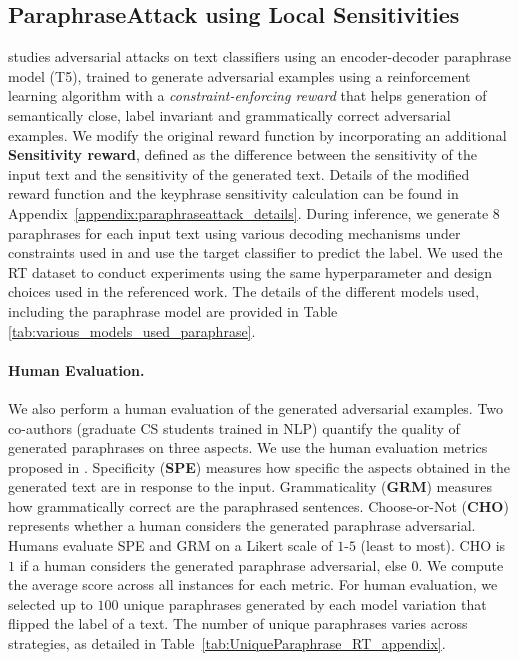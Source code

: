 \subsection{ParaphraseAttack using Local Sensitivities}
\label{sec:paraphraseAttack}
\citet{roth2024constraintenforcingrewardadversarialattacks} studies adversarial attacks on text classifiers using an encoder-decoder paraphrase model (T5), trained to generate adversarial examples using a reinforcement learning algorithm \cite{Williams2004SimpleSG} with a \textit{constraint-enforcing reward} that helps generation of semantically close, label invariant and grammatically correct adversarial examples. We modify the original reward function by incorporating an additional \textbf{Sensitivity reward}, defined as the difference between the sensitivity of the input text and the sensitivity of the generated text. Details of the modified reward function and the keyphrase sensitivity calculation can be found in Appendix~\ref{appendix:paraphraseattack_details}. During inference, we generate $8$ paraphrases for each input text using various decoding mechanisms under constraints used in \citet{roth2024constraintenforcingrewardadversarialattacks} and use the target classifier to predict the label. We used the RT dataset to conduct experiments using the same hyperparameter and design choices used in the referenced work. The details of the different models used, including the paraphrase model are provided in Table \ref{tab:various_models_used_paraphrase}.



\paragraph{Human Evaluation.} We also perform a human evaluation of the generated adversarial examples. Two co-authors (graduate CS students trained in NLP) quantify the quality of generated paraphrases on three aspects. We use the human evaluation metrics proposed in \citet{das-etal-2024-low}. Specificity (\textbf{SPE}) measures how specific the aspects obtained in the generated text are in response to the input. Grammaticality (\textbf{GRM}) measures how grammatically correct are the paraphrased sentences. Choose-or-Not (\textbf{CHO}) represents whether a human considers the generated paraphrase adversarial. Humans evaluate SPE and GRM on a Likert scale of $1$-$5$ (least to most). CHO is $1$ if a human considers the generated paraphrase adversarial, else $0$. We compute the average score across all instances for each metric. For human evaluation, we selected up to $100$ unique paraphrases generated by each model variation that flipped the label of a text. The number of unique paraphrases varies across strategies, as detailed in Table~\ref{tab:UniqueParaphrase_RT_appendix}. 

